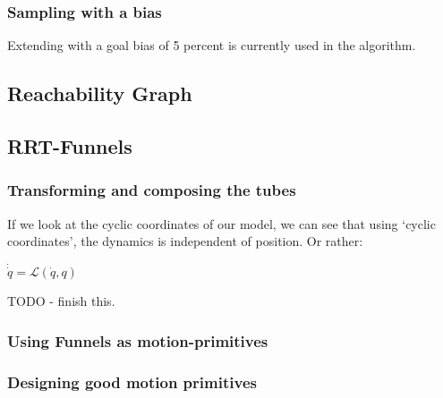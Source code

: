 \subsubsection{Sampling with a bias}

Extending with a goal bias of 5 percent is currently used in the \rrtfunnel{}
algorithm. 

\subsection{Reachability Graph}

\subsection{RRT-Funnels}


\subsubsection{Transforming and composing the tubes}

If we look at the cyclic coordinates of our model, we can see that using `cyclic
coordinates', the dynamics is independent of position. Or rather:

\begin{math}
  \dot{\dot{q}} = \mathcal{L}(\dot{q},q)
\end{math}

TODO - finish this.


\subsubsection{Using Funnels as motion-primitives}

\subsubsection{Designing good motion primitives}
